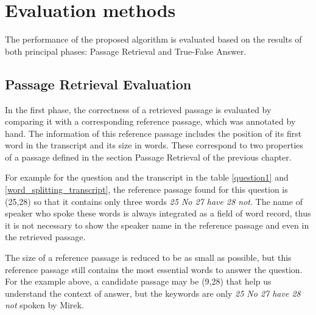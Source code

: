 \chapter{Evaluation methods}

The performance of the proposed algorithm is evaluated based on the results of both principal phases: Passage Retrieval and True-False Answer. 




\section{Passage Retrieval Evaluation}
In the first phase, the correctness of a retrieved passage is evaluated by comparing it with a corresponding reference passage, which was annotated by hand. The information of this reference passage includes the position of its first word in the transcript and its size in words. These correspond to two properties of a passage defined in the section Passage Retrieval of the previous chapter. 

For example for the question and the transcript in the table \ref{question1} and \ref{word_splitting_transcript}, the reference passage found for this question is (25,28) so that it contains only three words \textit{25 No 27 have 28 not}. The name of speaker who spoke these words is always integrated as a field of word record, thus it is not necessary to show the speaker name in the reference passage and even in the retrieved passage.

The size of a reference passage is reduced to be as small as possible, but this reference passage still contains the most essential words to answer the question. For the example above, a candidate passage may be (9,28) that help us understand the context of answer, but the keywords are only \textit{25 No 27 have 28 not} spoken by Mirek.

